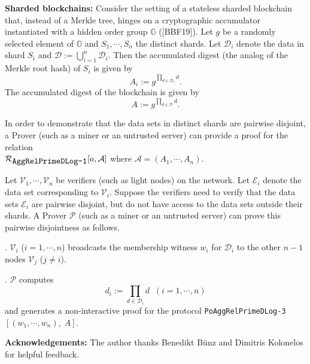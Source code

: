 \documentclass[11pt, lettersize, notitlepage, leqno, footskip=0.6cm]{article}
\newcommand{\pl}{\prod\limits}
\newcommand{\mc}{\mathcal}
\newcommand{\mb}{\mathbb}
\newcommand{\mP}{\mc{P}}
\newcommand{\V}{\mc{V}}
\newcommand{\vs}{\vspace{-0.15cm}}
\newcommand{\noin}{\noindent}
\numberwithin{equation}{section}
\begin{document}
\bigskip

\noin \textbf{Sharded blockchains:} Consider the setting of a stateless sharded blockchain that, instead of a Merkle tree, hinges on a cryptographic accumulator instantiated with a hidden order group $\mb{G}$ ([BBF19]). Let $g$ be a randomly selected element of $\mb{G}$ and $S_1,\cdots, S_n$ the distinct shards. Let $\mc{D}_i$ denote the data in shard $S_i$ and $\mc{D}:= \bigcup\limits_{i=1}^n \mc{D}_i$. Then the accumulated digest (the analog of the Merkle root hash) of $S_i$ is given by \vs $$A_i:= g^{\pl_{d\in\mc{D}_i} d}.$$  The accumulated digest of the blockchain is given by \vs $$A:= g^{\pl_{d\in \mc{D}} d}.$$

In order to demonstrate that the data sets in distinct shards are pairwise disjoint, a Prover (such as a miner or an untrusted server) can provide a proof for the relation\\ $\mc{R}_{{\protect\verb|AggRelPrimeDLog-1|}}[a, \mc{A}]$ where $\mc{A} = (A_1,\cdots,A_n)$.\vspace{0.2cm}

Let $\V_1,\cdots,\V_n$ be verifiers (such as light nodes) on the network. Let $\mc{E}_i$ denote the data set corresponding to $\V_i$. Suppose the verifiers need to verify that the data sets $\mc{E}_i$ are pairwise disjoint, but do not have access to the data sets outside their shards. A Prover $\mP$ (such as a miner or an untrusted server) can prove this pairwise disjointness as follows.\vspace{0.1cm}

\noin 1. $\V_i$ ($i=1,\cdots,n$) broadcasts the membership witness $w_i$ for $\mc{D}_i$ to the other $n-1$ nodes $\V_j$ ($j\neq i$). 

\noin 2. $\mP$ computes \vs $$d_i:= \pl_{d\in\mc{D}_i} d\;\;(i=1,\cdots,n)$$ and generates a non-interactive proof for the protocol \verb|PoAggRelPrimeDLog-3|$[(w_1,\cdots,w_n),\; A]$.




\bigskip










\bigskip

\bigskip

\bigskip

\bigskip

\noin \textbf{Acknowledgements:} The author thanks Benedikt B\"{u}nz and Dimitris Kolonelos for helpful feedback.
\end{document}
